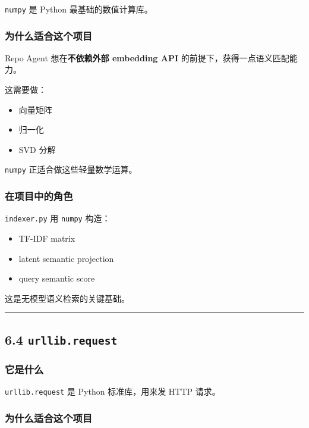 \documentclass[UTF8,12pt,openany]{ctexbook}
\begin{document}
\texttt{numpy} 是 Python 最基础的数值计算库。\par

\subsubsection{为什么适合这个项目}

Repo Agent 想在\textbf{不依赖外部 embedding API} 的前提下，获得一点语义匹配能力。  \par
这需要做：\par

\begin{itemize}
\item 向量矩阵
\item 归一化
\item SVD 分解
\end{itemize}

\texttt{numpy} 正适合做这些轻量数学运算。\par

\subsubsection{在项目中的角色}

\texttt{indexer.py} 用 \texttt{numpy} 构造：\par

\begin{itemize}
\item TF-IDF matrix
\item latent semantic projection
\item query semantic score
\end{itemize}

这是无模型语义检索的关键基础。\par

\hrule

\subsection{6.4 \texttt{urllib.request}}

\subsubsection{它是什么}

\texttt{urllib.request} 是 Python 标准库，用来发 HTTP 请求。\par

\subsubsection{为什么适合这个项目}
\end{document}

